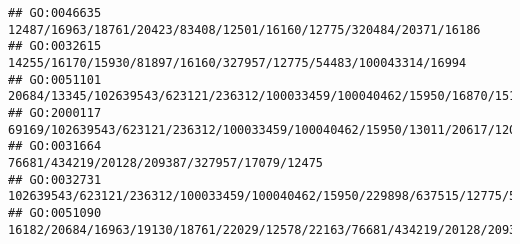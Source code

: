 \documentclass[
]{article}
\begin{document}
\begin{verbatim}
## GO:0046635                                                                                                                                                                                                                                                                                                                                           12487/16963/18761/20423/83408/12501/16160/12775/320484/20371/16186
## GO:0032615                                                                                                                                                                                                                                                                                                                                             14255/16170/15930/81897/16160/327957/12775/54483/100043314/16994
## GO:0051101                                                                                                                                                                                                                                                                                                                  20684/13345/102639543/623121/236312/100033459/100040462/15950/16870/15110/20666/16364/17702
## GO:2000117                                                                                                                                                                                                                                                                                                                              69169/102639543/623121/236312/100033459/100040462/15950/13011/20617/12047/15511
## GO:0031664                                                                                                                                                                                                                                                                                                                                                                 76681/434219/20128/209387/327957/17079/12475
## GO:0032731                                                                                                                                                                                                                                                                                                                                  102639543/623121/236312/100033459/100040462/15950/229898/637515/12775/54483
## GO:0051090                                                                                                                                                                                                                                            16182/20684/16963/19130/18761/22029/12578/22163/76681/434219/20128/209387/20679/434341/432530/15110/17702/18095/21943/15511/195359/224762/77596/13078/20371/17986

\end{verbatim}
\end{document}
